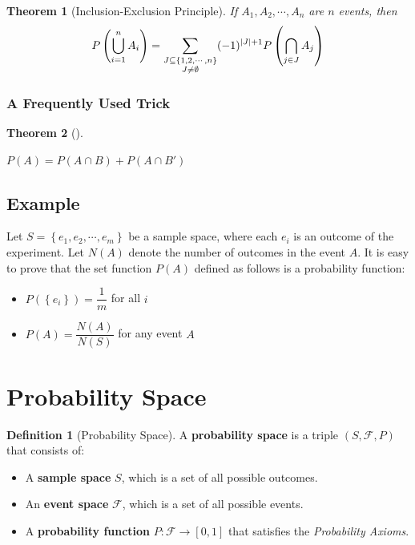 \documentclass[10pt,UTF8]{article}
\newenvironment{definition box}
{\begin{tcolorbox}[colback=blue!5!white,colframe=blue!75!black,parbox=false,before upper=\par,before lower=\par]}
{\end{tcolorbox}}
\newenvironment{theorem box}
{\begin{tcolorbox}[colback=yellow!5!white,colframe=yellow!75!black,parbox=false,before upper=\par,before lower=\par]}
{\end{tcolorbox}}
\theoremstyle{definition}
\newtheorem{definition inner}{Definition}[section]
\newenvironment{definition}[1][]
{\begin{definition box}\begin{definition inner}[#1]\hfill\par}
{\end{definition inner}\end{definition box}}
\theoremstyle{plain}
\newtheorem{theorem inner}{Theorem}[section]
\newenvironment{theorem}[1][]
{\begin{theorem box}\begin{theorem inner}[#1]\hfill\par}
{\end{theorem inner}\end{theorem box}}
\theoremstyle{definition}
\newtheorem*{proof inner}{\textit{Proof}}
\theoremstyle{remark}
\begin{document}
\begin{theorem}[Inclusion-Exclusion Principle]
    If $A_1, A_2, \cdots, A_n$ are $n$ events, then
    \begin{gather*}
        P\left(\bigcup_{i=1}^n A_i\right) = 
        \sum_{\substack{J \subseteq \{1,2,\cdots,n\}\\J\neq\emptyset}}(-1)^{\abs{J}+1}
        P\left(\bigcap_{j\in J} A_j\right)
    \end{gather*}
\end{theorem}
    
\subsubsection{A Frequently Used Trick}

\begin{theorem}
    \begin{center}
        $P(A) = P(A \cap B) + P(A \cap B')$
    \end{center}
\end{theorem}

\subsection{Example}

Let $S=\left\{e_1, e_2, \cdots, e_m\right\}$ be a sample space,
where each $e_i$ is an outcome of the experiment.
Let $N(A)$ denote the number of outcomes in the event $A$.
It is easy to prove that the set function $P(A)$ defined as follows is a probability function:
\begin{itemize}
    \item $P(\left\{e_i\right\}) = \dfrac{1}{m}$ for all $i$
    \item $P(A) = \dfrac{N(A)}{N(S)}$ for any event $A$
\end{itemize}



\section{Probability Space}

\begin{definition}[Probability Space]
    \noindent
    A \textbf{probability space} is a triple $(S, \mathcal{F}, P)$ that consists of:
    \begin{itemize}
        \item A \textbf{sample space} $S$, which is a set of all possible outcomes.
        \item An \textbf{event space} $\mathcal{F}$, which is a set of all possible events.
        \item A \textbf{probability function} $P: \mathcal{F} \to [0,1]$ that satisfies the \emph{Probability Axioms}.
    \end{itemize}
\end{definition}
\end{document}
